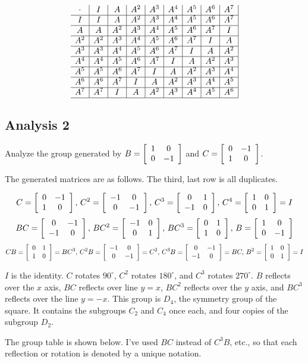 \documentclass[../gatm.tex]{subfiles}
\begin{document}
$$\begin{array}{c|c|c|c|c|c|c|c|c|}
\cdot & I & A & A^2 & A^3 & A^4 & A^5 & A^6 & A^7 \\ \hline
I & I & A & A^2 & A^3 & A^4 & A^5 & A^6 & A^7 \\ \hline
A & A & A^2 & A^3 & A^4 & A^5 & A^6 & A^7 & I \\ \hline
A^2 & A^2 & A^3 & A^4 & A^5 & A^6 & A^7 & I & A \\ \hline
A^3 & A^3 & A^4 & A^5 & A^6 & A^7 & I & A & A^2 \\ \hline
A^4 & A^4 & A^5 & A^6 & A^7 & I & A & A^2 & A^3 \\ \hline
A^5 & A^5 & A^6 & A^7 & I & A & A^2 & A^3 & A^4 \\ \hline
A^6 & A^6 & A^7 & I & A & A^2 & A^3 & A^4 & A^5 \\ \hline
A^7 & A^7 & I & A & A^2 & A^3 & A^4 & A^5 & A^6 \\ \hline
\end{array}$$

\subsection*{Analysis 2}

Analyze the group generated by $B=\left[\begin{array}{cc} 1 & 0 \\ 0 & -1 \end{array}\right]$ and $C=\left[\begin{array}{cc} 0 & -1 \\ 1 & 0 \end{array}\right]$.

The generated matrices are as follows. The third, last row is all duplicates.

$$C=\left[\begin{array}{cc} 0 & -1 \\ 1 & 0 \end{array}\right],\, C^2=\left[\begin{array}{cc} -1 & 0 \\ 0 & -1 \end{array}\right],\, C^3=\left[\begin{array}{cc} 0 & 1 \\ -1 & 0 \end{array}\right],\, C^4=\left[\begin{array}{cc} 1 & 0 \\ 0 & 1 \end{array}\right]=I$$
$$BC=\left[\begin{array}{cc} 0 & -1 \\ -1 & 0 \end{array}\right],\, BC^2=\left[\begin{array}{cc} -1 & 0 \\ 0 & 1 \end{array}\right],\, BC^3 = \left[\begin{array}{cc} 0 & 1 \\ 1 & 0 \end{array}\right],\, B = \left[\begin{array}{cc} 1 & 0 \\ 0 & -1 \end{array}\right]$$
$$CB=\left[\begin{array}{cc} 0 & 1 \\ 1 & 0 \end{array}\right]=BC^3,\, C^2B=\left[\begin{array}{cc} -1 & 0 \\ 0 & -1 \end{array}\right]=C^2,\, C^3B=\left[\begin{array}{cc} 0 & -1 \\ -1 & 0 \end{array}\right]=BC,\, B^2=\left[\begin{array}{cc} 1 & 0 \\ 0 & 1 \end{array}\right]=I$$

$I$ is the identity. $C$ rotates $90^\circ$, $C^2$ rotates $180^\circ$, and $C^3$ rotates $270^\circ$. $B$ reflects over the $x$ axis, $BC$ reflects over line $y=x$, $BC^2$ reflects over the $y$ axis, and $BC^3$ reflects over the line $y=-x$. This group is $D_4$, the symmetry group of the square. It contains the subgroups $C_2$ and $C_4$ once each, and four copies of the subgroup $D_2$.

The group table is shown below. I've used $BC$ instead of $C^3B$, etc., so that each reflection or rotation is denoted by a unique notation.
\end{document}
